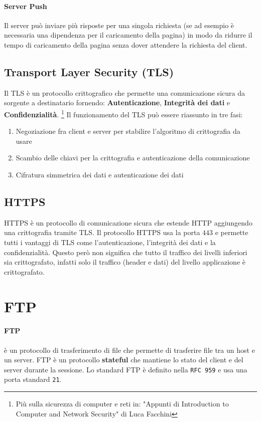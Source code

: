             \paragraph{Server Push} Il server può inviare più risposte per una singola richiesta (se ad esempio è necessaria una dipendenza per il caricamento della pagina) in modo da ridurre il tempo di caricamento della pagina senza dover attendere la richiesta del client.
    \subsection[Transport Layer Security (TLS)]{Transport Layer Security (\Acrshort*{TLS})}
        Il \acrfull*{TLS} è un protocollo crittografico che permette una comunicazione sicura da sorgente a destinatario fornendo: \textbf{Autenticazione}, \textbf{Integrità dei dati} e \textbf{Confidenzialità}. \footnote{Più sulla sicurezza di computer e reti in: "Appunti di Introduction to Computer and Network Security" di Luca Facchini}\newline
        Il funzionamento del \Acrshort*{TLS} può essere riassunto in tre fasi:
        \begin{enumerate}
            \item Negoziazione fra client e server per stabilire l'algoritmo di crittografia da usare
            \item Scambio delle chiavi per la crittografia e autenticazione della comunicazione
            \item Cifratura simmetrica dei dati e autenticazione dei dati
        \end{enumerate}
    \subsection[\texttt{HTTPS}]{\Acrshort*{HTTPS}}
        \Acrshort*{HTTPS} è un protocollo di comunicazione sicura che estende \Acrshort*{HTTP} aggiungendo una crittografia tramite \Acrshort*{TLS}. Il protocollo \Acrshort*{HTTPS} usa la porta $ 443 $ e permette tutti i vantaggi di \Acrshort*{TLS} come l'autenticazione, l'integrità dei dati e la confidenzialità. Questo però non significa che tutto il traffico dei livelli inferiori sia crittografato, infatti solo il traffico (header e dati) del livello applicazione è crittografato.
\section[FTP - File Transfer Protocol]{\acrfull*{FTP}}
    \paragraph{\acrfull*{FTP}} è un protocollo di trasferimento di file che permette di trasferire file tra un host e un server. \Acrshort*{FTP} è un protocollo \textbf{stateful} che mantiene lo stato del client e del server durante la sessione. Lo standard FTP è definito nella \texttt{\Acrshort*{RFC} 959} e usa una porta standard \texttt{21}.
